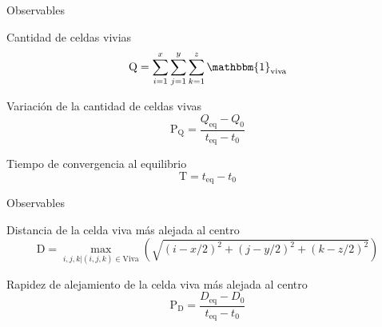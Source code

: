 \begin{frame}{Observables}

    \begin{block}{Cantidad de celdas vivias}
        \begin{equation}
            \text{Q} = \sum_{i=1}^{x} \sum_{j=1}^{y} \sum_{k=1}^{z} \mathbbm{1}_{\text{viva}}
            \label{eq:cantidad-celdas-vivas}
        \end{equation}
    \end{block}

    \begin{block}{Variación de la cantidad de celdas vivas}
        \begin{equation}
            \text{P}_{\text{Q}} = \frac{Q_{\text{eq}} - Q_{0}}{t_{\text{eq}} - t_{0}}
            \label{eq:pendiente-crecimiento-celdas-vivas}
        \end{equation}
    \end{block}

    \begin{block}{Tiempo de convergencia al equilibrio}
        \begin{equation}
            \text{T} = t_{\text{eq}} - t_{0}
            \label{eq:tiempo-convergencia-equilibrio}
        \end{equation}
    \end{block}


\end{frame}

\begin{frame}{Observables}

    \begin{block}{Distancia de la celda viva más alejada al centro}
        \begin{equation}
            \text{D} = \max_{i, j, k | (i, j, k) \in \text{Viva}} \left( \sqrt{(i - x/2)^2 + (j - y/2)^2 + (k - z/2)^2} \right)
            \label{eq:distancia-celda-viva-mas-alejada-al-centro}
        \end{equation}
    \end{block}

    \begin{block}{Rapidez de alejamiento de la celda viva más alejada al centro}
        \begin{equation}
            \text{P}_{\text{D}} = \frac{D_{\text{eq}} - D_{0}}{t_{\text{eq}} - t_{0}}
            \label{eq:rapidez-alejamiento-celda-viva-mas-alejada-al-centro}
        \end{equation}
    \end{block}


\end{frame}
